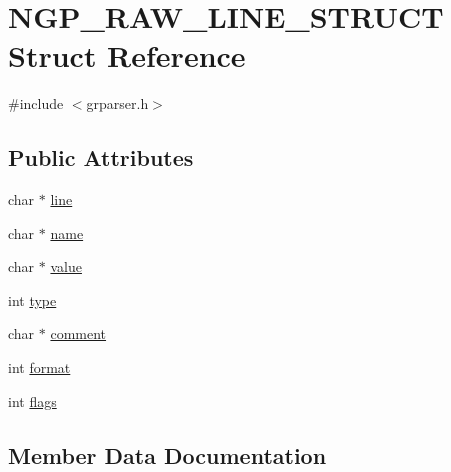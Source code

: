 \hypertarget{struct_n_g_p___r_a_w___l_i_n_e___s_t_r_u_c_t}{}\section{N\+G\+P\+\_\+\+R\+A\+W\+\_\+\+L\+I\+N\+E\+\_\+\+S\+T\+R\+U\+CT Struct Reference}
\label{struct_n_g_p___r_a_w___l_i_n_e___s_t_r_u_c_t}


{\ttfamily \#include $<$grparser.\+h$>$}

\subsection*{Public Attributes}
\begin{DoxyCompactItemize}
\item 
char $\ast$ \hyperlink{struct_n_g_p___r_a_w___l_i_n_e___s_t_r_u_c_t_af9b151511543061a79c257c3f25d62d9}{line}
\item 
char $\ast$ \hyperlink{struct_n_g_p___r_a_w___l_i_n_e___s_t_r_u_c_t_a9c5625bc39c023ea000d4fffed263940}{name}
\item 
char $\ast$ \hyperlink{struct_n_g_p___r_a_w___l_i_n_e___s_t_r_u_c_t_aca7f802d076ec725e124d4a4c5329e85}{value}
\item 
int \hyperlink{struct_n_g_p___r_a_w___l_i_n_e___s_t_r_u_c_t_a58fbb66f50dd9c2c885bff806cbd1a6f}{type}
\item 
char $\ast$ \hyperlink{struct_n_g_p___r_a_w___l_i_n_e___s_t_r_u_c_t_afa170fa07045cb82e23e86a16209fa69}{comment}
\item 
int \hyperlink{struct_n_g_p___r_a_w___l_i_n_e___s_t_r_u_c_t_aa5824fe1834591c23ba28f160219b0d5}{format}
\item 
int \hyperlink{struct_n_g_p___r_a_w___l_i_n_e___s_t_r_u_c_t_a3449954f2ad2dd69bee36861f38d7fa9}{flags}
\end{DoxyCompactItemize}


\subsection{Member Data Documentation}
\mbox{\label{struct_n_g_p___r_a_w___l_i_n_e___s_t_r_u_c_t_afa170fa07045cb82e23e86a16209fa69}} 
